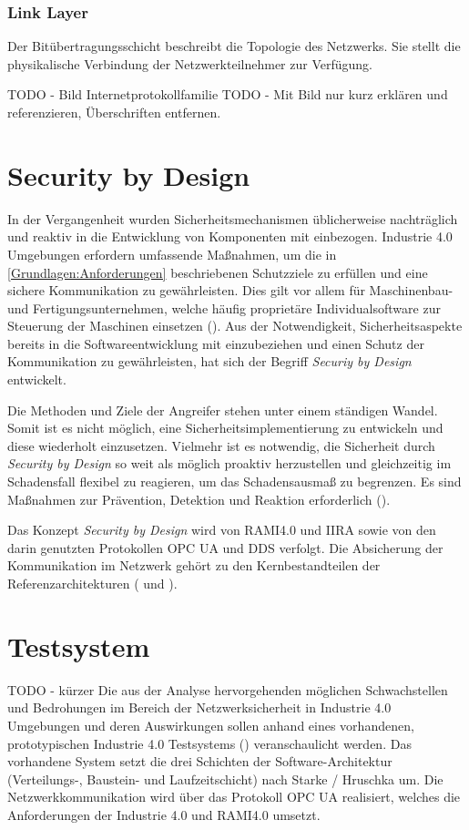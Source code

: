 \subsubsection{Link Layer}
Der Bitübertragungsschicht beschreibt die Topologie des Netzwerks. Sie stellt die physikalische Verbindung der Netzwerkteilnehmer zur Verfügung.

TODO - Bild Internetprotokollfamilie
TODO - Mit Bild nur kurz erklären und referenzieren, Überschriften entfernen.

\section{Security by Design}
\label{Grundlagen:Security by Design}
In der Vergangenheit wurden Sicherheitsmechanismen üblicherweise nachträglich und reaktiv in die Entwicklung von Komponenten mit einbezogen. Industrie 4.0 Umgebungen erfordern umfassende Maßnahmen, um die in \autoref{Grundlagen:Anforderungen} beschriebenen Schutzziele zu erfüllen und eine sichere Kommunikation zu gewährleisten. Dies gilt vor allem für Maschinenbau- und Fertigungsunternehmen, welche häufig proprietäre Individualsoftware zur Steuerung der Maschinen einsetzen (\cite{DTAG2016}). Aus der Notwendigkeit, Sicherheitsaspekte bereits in die Softwareentwicklung mit einzubeziehen und einen Schutz der Kommunikation zu gewährleisten, hat sich der Begriff \textit{Securiy by Design} entwickelt.

Die Methoden und Ziele der Angreifer stehen unter einem ständigen Wandel. Somit ist es nicht möglich, eine Sicherheitsimplementierung zu entwickeln und diese wiederholt einzusetzen. Vielmehr ist es notwendig, die Sicherheit durch \textit{Security by Design} so weit als möglich proaktiv herzustellen und gleichzeitig im Schadensfall flexibel zu reagieren, um das Schadensausmaß zu begrenzen. Es sind Maßnahmen zur Prävention, Detektion und Reaktion erforderlich (\cite{Umsetzung2015}). 

Das Konzept \textit{Security by Design} wird von \ac{RAMI4.0} und \ac{IIRA} sowie von den darin genutzten Protokollen \ac{OPC UA} und \ac{DDS} verfolgt. Die Absicherung der Kommunikation im Netzwerk gehört zu den Kernbestandteilen der Referenzarchitekturen (\cite{iirasec2017} und \cite{opcpt2}).

\section{Testsystem}
\label{Grundlagen:Testsystem}
TODO - kürzer
Die aus der Analyse hervorgehenden möglichen Schwachstellen und Bedrohungen im Bereich der Netzwerksicherheit in Industrie 4.0 Umgebungen und deren Auswirkungen sollen anhand eines vorhandenen, prototypischen Industrie 4.0 Testsystems (\cite{Weber2018}) veranschaulicht werden. Das vorhandene System setzt die drei Schichten der Software-Architektur (Verteilungs-, Baustein- und Laufzeitschicht) nach Starke / Hruschka um. Die Netzwerkkommunikation wird über das Protokoll \ac{OPC UA} realisiert, welches die Anforderungen der Industrie 4.0 und \ac{RAMI4.0} umsetzt.

